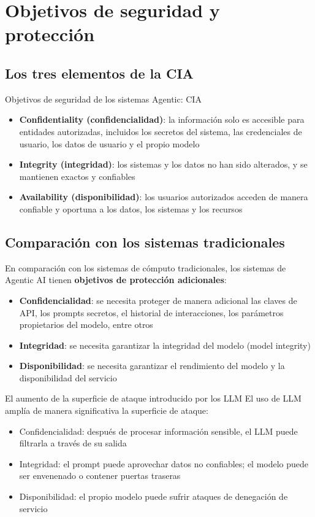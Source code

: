 \section{Objetivos de seguridad y protección}

\subsection{Los tres elementos de la CIA}

\begin{importantbox}{Objetivos de seguridad de los sistemas Agentic: CIA}
\begin{itemize}
    \item \textbf{Confidentiality (confidencialidad)}: la información solo es accesible para entidades autorizadas, incluidos los secretos del sistema, las credenciales de usuario, los datos de usuario y el propio modelo
    \item \textbf{Integrity (integridad)}: los sistemas y los datos no han sido alterados, y se mantienen exactos y confiables
    \item \textbf{Availability (disponibilidad)}: los usuarios autorizados acceden de manera confiable y oportuna a los datos, los sistemas y los recursos
\end{itemize}
\end{importantbox}

\subsection{Comparación con los sistemas tradicionales}

En comparación con los sistemas de cómputo tradicionales, los sistemas de Agentic AI tienen \textbf{objetivos de protección adicionales}:
\begin{itemize}
    \item \textbf{Confidencialidad}: se necesita proteger de manera adicional las claves de API, los prompts secretos, el historial de interacciones, los parámetros propietarios del modelo, entre otros
    \item \textbf{Integridad}: se necesita garantizar la integridad del modelo (model integrity)
    \item \textbf{Disponibilidad}: se necesita garantizar el rendimiento del modelo y la disponibilidad del servicio
\end{itemize}

\begin{warningbox}{El aumento de la superficie de ataque introducido por los LLM}
El uso de LLM amplía de manera significativa la superficie de ataque:
\begin{itemize}
    \item Confidencialidad: después de procesar información sensible, el LLM puede filtrarla a través de su salida
    \item Integridad: el prompt puede aprovechar datos no confiables; el modelo puede ser envenenado o contener puertas traseras
    \item Disponibilidad: el propio modelo puede sufrir ataques de denegación de servicio
\end{itemize}
\end{warningbox}

